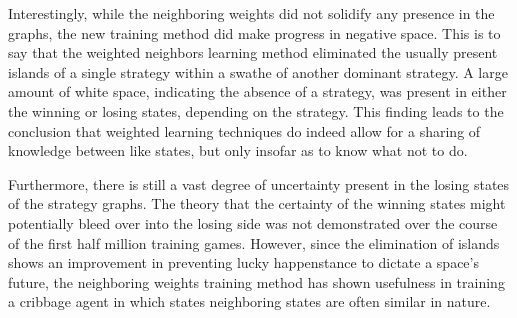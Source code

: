 Interestingly,
while the neighboring weights did not solidify any presence in the graphs,
the new training method did make progress in negative space.
%
This is to say that
the weighted neighbors learning method eliminated the usually present islands
of a single strategy within a swathe of another dominant strategy.
%
A large amount of white space,
indicating the absence of a strategy,
was present in either the winning or losing states,
depending on the strategy.
%
This finding leads to the conclusion that weighted learning techniques
do indeed allow for a sharing of knowledge between like states,
but only insofar as to know what not to do.

Furthermore,
there is still a vast degree of uncertainty present in the losing states of
the strategy graphs.
%
The theory that the certainty of the winning states might potentially
bleed over into the losing side was not demonstrated over the course of
the first half million training games.
%
However,
since the elimination of islands shows an improvement in
preventing lucky happenstance to dictate a space's future,
the neighboring weights training method has shown usefulness in training a
cribbage agent in which states neighboring states are often similar in nature.

